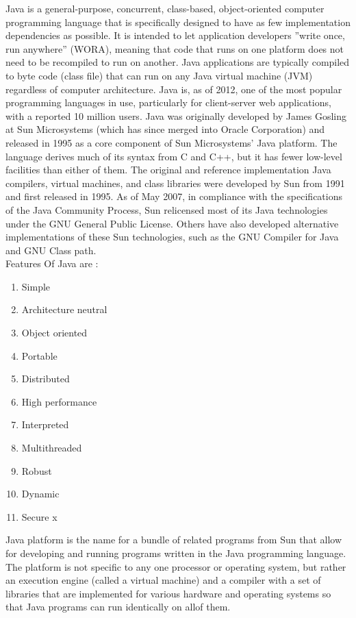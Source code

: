 \documentclass[oneside,a4paper,12pt]{report}
\begin{document}
{ Java is a general-purpose, concurrent, class-based, object-oriented computer programming language that is specifically designed to have as few implementation dependencies as possible. It is intended to let application developers ”write once, run anywhere” (WORA), meaning that code that runs on one platform does not need to be recompiled to run on another. Java applications are typically compiled to byte code (class file) that can run on any Java virtual machine (JVM) regardless of computer architecture. Java is, as of 2012, one of the most popular programming languages in use, particularly for client-server web applications, with a reported 10 million users. Java was originally developed by James Gosling at Sun Microsystems (which has since merged into Oracle Corporation) and released in 1995 as a core component of Sun Microsystems’ Java platform. The language derives much of its syntax from C and C++, but it has fewer low-level facilities than either of them. The original and reference implementation Java compilers, virtual machines, and class libraries were developed by Sun from 1991 and first released in 1995. As of May 2007, in compliance with the specifications of the Java Community Process, Sun relicensed most of its Java technologies under the GNU General Public License. Others have also developed alternative implementations of these Sun technologies, such as the GNU Compiler for Java and GNU Class path.
 \\
 Features Of Java are :  	
 \begin{enumerate}
 	\item Simple
 	\item Architecture neutral
 	\item Object oriented
 	\item Portable
 	\item Distributed	
 	\item High performance
 	\item Interpreted	
 	\item Multithreaded
 	\item Robust
 	\item Dynamic
 	\item Secure	x
 \end{enumerate}
 
 Java platform is the name for a bundle of related programs from Sun that allow for developing and running programs written in the Java programming language. The platform is not specific to any one processor or operating system, but rather an execution engine (called a virtual machine) and a compiler with a set of libraries that are implemented for various hardware and operating systems so that Java programs can run identically on allof them.

}
\end{document}
